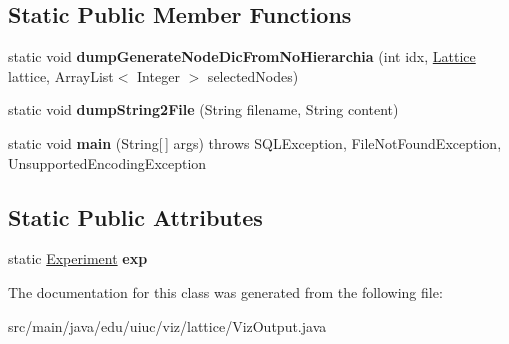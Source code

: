 \subsection*{Static Public Member Functions}
\begin{DoxyCompactItemize}
\item 
\mbox{\label{classedu_1_1uiuc_1_1viz_1_1lattice_1_1_viz_output_a5bbb92bff7d20d7b90bce0e744550167}} 
static void {\bfseries dump\+Generate\+Node\+Dic\+From\+No\+Hierarchia} (int idx, \mbox{\hyperlink{classedu_1_1uiuc_1_1viz_1_1lattice_1_1_lattice}{Lattice}} lattice, Array\+List$<$ Integer $>$ selected\+Nodes)
\item 
\mbox{\label{classedu_1_1uiuc_1_1viz_1_1lattice_1_1_viz_output_aca987f1302f44567b1e34d16dc32081c}} 
static void {\bfseries dump\+String2\+File} (String filename, String content)
\item 
\mbox{\label{classedu_1_1uiuc_1_1viz_1_1lattice_1_1_viz_output_a2d4b1d337505ba5ac7e2332fe0309224}} 
static void {\bfseries main} (String\mbox{[}$\,$\mbox{]} args)  throws S\+Q\+L\+Exception, File\+Not\+Found\+Exception, Unsupported\+Encoding\+Exception  	
\end{DoxyCompactItemize}
\subsection*{Static Public Attributes}
\begin{DoxyCompactItemize}
\item 
\mbox{\label{classedu_1_1uiuc_1_1viz_1_1lattice_1_1_viz_output_a3192697fe0bef42f79b1eb58ba57bac0}} 
static \mbox{\hyperlink{classedu_1_1uiuc_1_1viz_1_1algorithms_1_1_experiment}{Experiment}} {\bfseries exp}
\end{DoxyCompactItemize}


The documentation for this class was generated from the following file\+:\begin{DoxyCompactItemize}
\item 
src/main/java/edu/uiuc/viz/lattice/Viz\+Output.\+java\end{DoxyCompactItemize}
